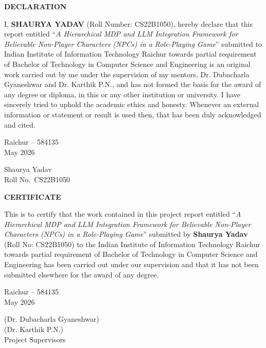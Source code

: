 \documentclass[12pt, a4paper, oneside]{report}
\newcommand{\thesisTitle}{A Hierarchical MDP and LLM Integration Framework for Believable Non-Player Characters (NPCs) in a Role-Playing Game}
\newcommand{\studentName}{Shaurya Yadav}
\newcommand{\rollNumber}{CS22B1050}
\newcommand{\supervisorName}{Dr. Dubacharla Gyaneshwar}
\newcommand{\supervisorNameB}{Dr. Karthik P.N.}
\newcommand{\departmentName}{Computer Science and Engineering}
\newcommand{\submissionMonthYear}{May 2026}
\newcommand{\submissionLocation}{Raichur -- 584135}
\newcommand{\degreeName}{Bachelor of Technology}
\newcommand{\frontmatterheading}[1]{%
  \begin{center}\Large\bfseries #1\end{center}
  \vspace{0.5cm}
}
\begin{document}
\setcounter{page}{2}

\clearpage
\thispagestyle{plain}
\frontmatterheading{DECLARATION}

\noindent I, \textbf{\MakeUppercase{\studentName}} (Roll Number: \rollNumber), hereby
declare that this report entitled ``\textit{\thesisTitle}'' submitted to
Indian Institute of Information Technology Raichur towards partial requirement
of \degreeName{} in \departmentName{} is an original work carried out by me
under the supervision of my mentors, \supervisorName{} and \supervisorNameB{},
and has not formed the
basis for the award of any degree or diploma, in this or any other institution
or university. I have sincerely tried to uphold the academic ethics and
honesty. Whenever an external information or statement or result is used then,
that has been duly acknowledged and cited.

\vspace{2.5cm}
\noindent
\begin{minipage}[t]{0.5\textwidth}
\submissionLocation \\
\submissionMonthYear
\end{minipage}
\hfill
\begin{minipage}[t]{0.4\textwidth}
\raggedleft
\studentName \\
Roll No.~\rollNumber
\end{minipage}

\clearpage
\thispagestyle{plain}
\frontmatterheading{CERTIFICATE}

\noindent This is to certify that the work contained in this project report
entitled ``\textit{\thesisTitle}'' submitted by \textbf{\studentName} (Roll
No: \rollNumber) to the
Indian Institute of Information Technology Raichur towards partial requirement
of \degreeName{} in \departmentName{} has been carried out under our
supervision and that it has not been submitted elsewhere for the award of any
degree.

\vspace{3cm}
\noindent
\begin{minipage}[t]{0.5\textwidth}
\submissionLocation \\
\submissionMonthYear
\end{minipage}
\hfill
\begin{minipage}[t]{0.4\textwidth}
\raggedleft
(\supervisorName) \\[1em]
(\supervisorNameB) \\
Project Supervisors
\end{minipage}
\end{document}
